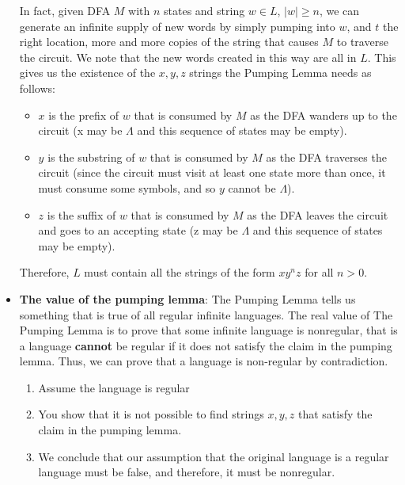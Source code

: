 \documentclass{report}
\begin{document}
\begin{itemize}
        \bigbreak \noindent 
        In fact, given DFA $M$ with $n$ states and string $w \in L$, $|w| \geq n$, we can generate an infinite supply of new words by simply pumping into $w$, and $t$ the right location, more and more copies of the string that causes $M$ to traverse the circuit. We note that the new words created in this way are all in $L$.
        \bigbreak \noindent 
        This gives us the existence of the $x,y,z$ strings the Pumping Lemma needs as follows:
            \begin{itemize}
                \item $x$ is the prefix of $w$ that is consumed by $M$ as the DFA wanders up to the circuit (x may be $\Lambda$ and this sequence of states may be empty).
                \item $y$ is the substring of $w$ that is consumed by $M$ as the DFA traverses the circuit (since the circuit must visit at least one state more than once, it must consume some symbols, and so $y$ cannot be $\Lambda$).
                \item $z$ is the suffix of $w$ that is consumed by $M$ as the DFA leaves the circuit and goes to an accepting state (z may be $\Lambda$ and this sequence of states may be empty).
            \end{itemize}
            \bigbreak \noindent 
            Therefore, $L$ must contain all the strings of the form $xy^{n}z$ for all $n>0$.
            \bigbreak \noindent 
            \pagebreak \bigbreak \noindent 
\begin{figure}[ht]
    \centering
    \label{fig:p3}
\end{figure}
\bigbreak \noindent 
\item \textbf{The value of the pumping lemma}: The Pumping Lemma tells us something that is true of all regular infinite languages. 
    \bigbreak \noindent 
    The real value of The Pumping Lemma is to prove that some infinite language is nonregular, that is a language \textbf{cannot} be regular if it does not satisfy the claim in the pumping lemma. Thus, we can prove that a language is non-regular by contradiction.
    \bigbreak \noindent 
    \begin{enumerate}
        \item Assume the language is regular
        \item You show that it is not possible to find strings $x,y,z$ that satisfy the claim in the pumping lemma.
        \item We conclude that our assumption that the original language is a regular language must be false, and therefore, it must be nonregular.

\end{enumerate}
\end{itemize}
\end{document}
